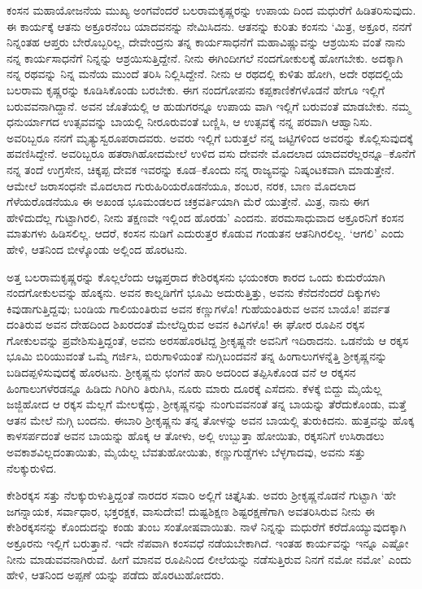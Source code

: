 ಕಂಸನ ಮಹಾಯೋಜನೆಯ ಮುಖ್ಯ ಅಂಗವೆಂದರೆ ಬಲರಾಮಕೃಷ್ಣರನ್ನು ಉಪಾಯ ದಿಂದ ಮಧುರೆಗೆ ಹಿಡಿತರಿಸುವುದು. ಈ ಕಾರ್ಯಕ್ಕೆ ಆತನು ಅಕ್ರೂರನೆಂಬ ಯಾದವನನ್ನು ನೇಮಿಸಿದನು. ಆತನನ್ನು ಕುರಿತು ಕಂಸನು ‘ಮಿತ್ರ, ಅಕ್ರೂರ, ನನಗೆ ನಿನ್ನಂತಹ ಆಪ್ತರು ಬೇರೊಬ್ಬರಿಲ್ಲ, ದೇವೇಂದ್ರನು ತನ್ನ ಕಾರ್ಯಸಾಧನೆಗೆ ಮಹಾವಿಷ್ಣುವನ್ನು ಆಶ್ರಯಿಸು ವಂತೆ ನಾನು ನನ್ನ ಕಾರ್ಯಸಾಧನೆಗೆ ನಿನ್ನನ್ನು ಆಶ್ರಯಿಸುತ್ತಿದ್ದೇನೆ. ನೀನು ಈಗಿಂದೀಗಲೆ ನಂದಗೋಕುಲಕ್ಕೆ ಹೋಗಬೇಕು. ಅದಕ್ಕಾಗಿ ನನ್ನ ರಥವನ್ನು ನಿನ್ನ ಮನೆಯ ಮುಂದೆ ತರಿಸಿ ನಿಲ್ಲಿಸಿದ್ದೇನೆ. ನೀನು ಆ ರಥದಲ್ಲಿ ಕುಳಿತು ಹೋಗಿ, ಅದೇ ರಥದಲ್ಲಿಯೆ ಬಲರಾಮ ಕೃಷ್ಣರನ್ನು ಕೂಡಿಸಿಕೊಂಡು ಬರಬೇಕು. ಈಗ ನಂದಗೋಪನು ಕಪ್ಪಕಾಣಿಕೆಗಳೊಡನೆ ಹೇಗೂ ಇಲ್ಲಿಗೆ ಬರುವವನಾಗಿದ್ದಾನೆ. ಅವನ ಜೊತೆಯಲ್ಲಿ ಆ ಹುಡುಗರನ್ನೂ ಉಪಾಯ ವಾಗಿ ಇಲ್ಲಿಗೆ ಬರುವಂತೆ ಮಾಡಬೇಕು. ನಮ್ಮ ಧನುರ್ಯಾಗದ ಉತ್ಸವವನ್ನು ಬಾಯಲ್ಲಿ ನೀರೂರುವಂತೆ ಬಣ್ಣಿಸಿ, ಆ ಉತ್ಸವಕ್ಕೆ ನನ್ನ ಪರವಾಗಿ ಆಹ್ವಾನಿಸು. ಅವರಿಬ್ಬರೂ ನನಗೆ ಮೃತ್ಯುಸ್ವರೂಪರಾದವರು. ಅವರು ಇಲ್ಲಿಗೆ ಬರುತ್ತಲೆ ನನ್ನ ಜಟ್ಟಿಗಳಿಂದ ಅವರನ್ನು ಕೊಲ್ಲಿಸುವುದಕ್ಕೆ ಹವಣಿಸಿದ್ದೇನೆ. ಅವರಿಬ್ಬರೂ ಹತರಾಗಿಹೋದಮೇಲೆ ಉಳಿದ ವಸು ದೇವನೇ ಮೊದಲಾದ ಯಾದವರೆಲ್ಲರನ್ನೂ–ಕೊನೆಗೆ ನನ್ನ ತಂದೆ ಉಗ್ರಸೇನ, ಚಿಕ್ಕಪ್ಪ ದೇವಕ ಇವರನ್ನು ಕೂಡ–ಕೊಂದು ನನ್ನ ರಾಜ್ಯವನ್ನು ನಿಷ್ಕಂಟಕವಾಗಿ ಮಾಡುತ್ತೇನೆ. ಆಮೇಲೆ ಜರಾಸಂಧನೇ ಮೊದಲಾದ ಗುರುಹಿರಿಯರೊಡನೆಯೂ, ಶಂಬರ, ನರಕ, ಬಾಣ ಮೊದಲಾದ ಗೆಳೆಯರೊಡನೆಯೂ ಈ ಅಖಂಡ ಭೂಮಂಡಲದ ಚಕ್ರವರ್ತಿಯಾಗಿ ಮೆರೆ ಯುತ್ತೇನೆ. ಮಿತ್ರ, ನಾನು ಈಗ ಹೇಳಿದುದೆಲ್ಲ ಗುಟ್ಟಾಗಿರಲಿ, ನೀನು ತಕ್ಷಣವೇ ಇಲ್ಲಿಂದ ಹೊರಡು’ ಎಂದನು. ಪರಮಸಾಧುವಾದ ಅಕ್ರೂರನಿಗೆ ಕಂಸನ ಮಾತುಗಳು ಹಿಡಿಸಲಿಲ್ಲ. ಆದರೆ, ಕಂಸನ ನುಡಿಗೆ ಎದುರುತ್ತರ ಕೊಡುವ ಗಂಡುತನ ಆತನಿಗಿರಲಿಲ್ಲ. ‘ಆಗಲಿ’ ಎಂದು ಹೇಳಿ, ಆತನಿಂದ ಬೀಳ್ಕೊಂಡು ಅಲ್ಲಿಂದ ಹೊರಟನು.

ಅತ್ತ ಬಲರಾಮಕೃಷ್ಣರನ್ನು ಕೊಲ್ಲಲೆಂದು ಆಜ್ಞಪ್ತರಾದ ಕೇಶಿರಕ್ಕಸನು ಭಯಂಕರಾ ಕಾರದ ಒಂದು ಕುದುರೆಯಾಗಿ ನಂದಗೋಕುಲವನ್ನು ಹೊಕ್ಕನು. ಅವನ ಕಾಲ್ನಡಿಗೆಗೆ ಭೂಮಿ ಅದುರುತ್ತಿತ್ತು, ಅವನು ಕೆನೆದನೆಂದರೆ ದಿಕ್ಕುಗಳು ಕಿವುಡಾಗುತ್ತಿದ್ದವು; ಬಂಡಿಯ ಗಾಲಿಯಂತಿರುವ ಅವನ ಕಣ್ಣುಗಳೊ! ಗುಹೆಯಂತಿರುವ ಅವನ ಬಾಯೊ! ಪರ್ವತ ದಂತಿರುವ ಅವನ ದೇಹದಿಂದ ಶಿಖರದಂತೆ ಮೇಲೆದ್ದಿರುವ ಅವನ ಕಿವಿಗಳೊ! ಈ ಘೋರ ರೂಪಿನ ರಕ್ಕಸ ಗೋಕುಲವನ್ನು ಪ್ರವೇಶಿಸುತ್ತಿದ್ದಂತೆ, ಅವನು ಅರಸಹೊರಟಿದ್ದ ಶ್ರೀಕೃಷ್ಣನೇ ಅವನಿಗೆ ಇದಿರಾದನು. ಒಡನೆಯೆ ಆ ರಕ್ಕಸ ಭೂಮಿ ಬಿರಿಯುವಂತೆ ಒಮ್ಮೆ ಗರ್ಜಿಸಿ, ಬಿರುಗಾಳಿಯಂತೆ ನುಗ್ಗಿಬಂದವನೆ ತನ್ನ ಹಿಂಗಾಲುಗಳನ್ನೆತ್ತಿ ಶ್ರೀಕೃಷ್ಣನನ್ನು ಬಡಿದಪ್ಪಳಿಸುವುದಕ್ಕೆ ಹೊರಟನು. ಶ್ರೀಕೃಷ್ಣನು ಛಂಗನೆ ಹಾರಿ ಅದರಿಂದ ತಪ್ಪಿಸಿಕೊಂಡ ವನೆ ಆ ರಕ್ಕಸನ ಹಿಂಗಾಲುಗಳೆರಡನ್ನೂ ಹಿಡಿದು ಗಿರಿಗಿರಿ ತಿರುಗಿಸಿ, ನೂರು ಮಾರು ದೂರಕ್ಕೆ ಎಸೆದನು. ಕೆಳಕ್ಕೆ ಬಿದ್ದು ಮೈಯೆಲ್ಲ ಜಜ್ಜಿಹೋದ ಆ ರಕ್ಕಸ ಮೆಲ್ಲಗೆ ಮೇಲಕ್ಕೆದ್ದು, ಶ್ರೀಕೃಷ್ಣನನ್ನು ನುಂಗುವವನಂತೆ ತನ್ನ ಬಾಯನ್ನು ತೆರೆದುಕೊಂಡು, ಮತ್ತೆ ಆತನ ಮೇಲೆ ನುಗ್ಗಿ ಬಂದನು. ಈಬಾರಿ ಶ್ರೀಕೃಷ್ಣನು ತನ್ನ ತೋಳನ್ನು ಅವನ ಬಾಯಲ್ಲಿ ತುರುಕಿದನು. ಹುತ್ತವನ್ನು ಹೊಕ್ಕ ಕಾಳಸರ್ಪದಂತೆ ಅವನ ಬಾಯನ್ನು ಹೊಕ್ಕ ಆ ತೋಳು, ಅಲ್ಲಿ ಉಬ್ಬುತ್ತಾ ಹೋಯಿತು, ರಕ್ಕಸನಿಗೆ ಉಸಿರಾಡಲು ಅವಕಾಶವಿಲ್ಲದಂತಾಯಿತು, ಮೈಯೆಲ್ಲ ಬೆವತುಹೋಯಿತು, ಕಣ್ಣುಗುಡ್ಡೆಗಳು ಬೆಳ್ಳಗಾದವು, ಅವನು ಸತ್ತು ನೆಲಕ್ಕುರುಳಿದ.

ಕೇಶಿರಕ್ಕಸ ಸತ್ತು ನೆಲಕ್ಕುರುಳುತ್ತಿದ್ದಂತೆ ನಾರದರ ಸವಾರಿ ಅಲ್ಲಿಗೆ ಚಿತ್ತೈಸಿತು. ಅವರು ಶ್ರೀಕೃಷ್ಣನೊಡನೆ ಗುಟ್ಟಾಗಿ ‘ಹೇ ಜಗನ್ನಾಯಕ, ಸರ್ವಾಧಾರ, ಭಕ್ತರಕ್ಷಕ, ವಾಸುದೇವ! ದುಷ್ಟಶಿಕ್ಷಣ ಶಿಷ್ಟರಕ್ಷಣೆಗಾಗಿ ಅವತರಿಸಿರುವ ನೀನು ಈ ಕೇಶಿರಕ್ಕಸನನ್ನು ಕೊಂದುದನ್ನು ಕಂಡು ತುಂಬ ಸಂತೋಷವಾಯಿತು. ನಾಳೆ ನಿನ್ನನ್ನು ಮಧುರೆಗೆ ಕರೆದೊಯ್ಯುವುದಕ್ಕಾಗಿ ಅಕ್ರೂರನು ಇಲ್ಲಿಗೆ ಬರುತ್ತಾನೆ. ಇದೇ ನೆಪವಾಗಿ ಕಂಸವಧೆ ನಡೆಯಬೇಕಾಗಿದೆ. ಇಂತಹ ಕಾರ್ಯವನ್ನು ಇನ್ನೂ ಎಷ್ಟೋ ನೀನು ಮಾಡುವವನಾಗಿರುವೆ. ಹೀಗೆ ಮಾನವ ರೂಪಿನಿಂದ ಲೀಲೆಯನ್ನು ನಡೆಸುತ್ತಿರುವ ನಿನಗೆ ನಮೋ ನಮೋ’ ಎಂದು ಹೇಳಿ, ಆತನಿಂದ ಅಪ್ಪಣೆ ಯನ್ನು ಪಡೆದು ಹೊರಟುಹೋದರು.

